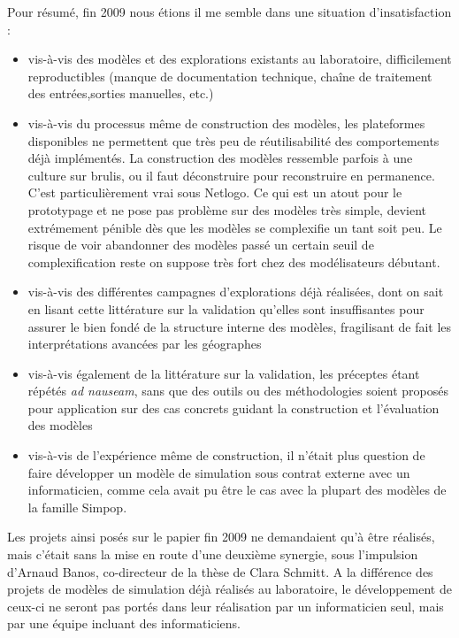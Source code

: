 Pour résumé, fin 2009 nous étions il me semble dans une situation d'insatisfaction :
\begin{itemize}[noitemsep,nolistsep]
\item  vis-à-vis des modèles et des explorations existants au laboratoire, difficilement reproductibles (manque de documentation technique, chaîne de traitement des entrées,sorties manuelles, etc.)

\item vis-à-vis du processus même de construction des modèles, les plateformes disponibles ne permettent que très peu de réutilisabilité des comportements déjà implémentés. La construction des modèles ressemble parfois à une culture sur brulis, ou il faut déconstruire pour reconstruire en permanence.  C'est particulièrement vrai sous Netlogo. Ce qui est un atout pour le prototypage et ne pose pas problème sur des modèles très simple, devient extrémement pénible dès que les modèles se complexifie un tant soit peu. Le risque de voir abandonner des modèles passé un certain seuil de complexification reste on suppose très fort chez des modélisateurs débutant.

\item vis-à-vis des différentes campagnes d'explorations déjà réalisées, dont on sait en lisant cette littérature sur la validation qu'elles sont insuffisantes pour assurer le bien fondé de la structure interne des modèles, fragilisant de fait les interprétations avancées par les géographes

\item vis-à-vis également de la littérature sur la validation, les préceptes étant répétés \textit{ad nauseam}, sans que des outils ou des méthodologies soient proposés pour application sur des cas concrets guidant la construction et l'évaluation des modèles

\item vis-à-vis de l'expérience même de construction, il n'était plus question de faire développer un modèle de simulation sous contrat externe avec un informaticien, comme cela avait pu être le cas avec la plupart des modèles de la famille Simpop. %

\end{itemize}

Les projets ainsi posés sur le papier fin 2009 ne demandaient qu'à être réalisés, mais c'était sans la mise en route d'une deuxième synergie, sous l'impulsion d'Arnaud Banos, co-directeur de la thèse de Clara Schmitt. A la différence des projets de modèles de simulation déjà réalisés au laboratoire, le développement de ceux-ci ne seront pas portés dans leur réalisation par un informaticien seul, mais par une équipe incluant des informaticiens.

